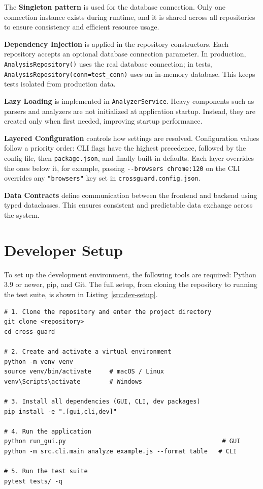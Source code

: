 The \textbf{Singleton pattern} is used for the database connection. Only one connection instance exists during runtime, and it is shared across all repositories to ensure consistency and efficient resource usage.

\textbf{Dependency Injection} is applied in the repository constructors. Each repository accepts an optional database connection parameter. In production, \texttt{AnalysisRepository()} uses the real database connection; in tests, \texttt{AnalysisRepository(conn=test\_conn)} uses an in-memory database. This keeps tests isolated from production data.

\textbf{Lazy Loading} is implemented in \texttt{AnalyzerService}. Heavy components such as parsers and analyzers are not initialized at application startup. Instead, they are created only when first needed, improving startup performance.

\textbf{Layered Configuration} controls how settings are resolved. Configuration values follow a priority order: CLI flags have the highest precedence, followed by the config file, then \texttt{package.json}, and finally built-in defaults. Each layer overrides the ones below it, for example, passing \texttt{-{}-browsers chrome:120} on the CLI overrides any \texttt{"browsers"} key set in \texttt{crossguard.config.json}.

\textbf{Data Contracts} define communication between the frontend and backend using typed dataclasses. This ensures consistent and predictable data exchange across the system.

\section{Developer Setup}
\label{sec:setup}

To set up the development environment, the following tools are required: Python 3.9 or newer, pip, and Git. The full setup, from cloning the repository to running the test suite, is shown in Listing~\ref{src:dev-setup}.

\begin{lstlisting}[caption={Complete developer setup: clone, virtual environment, install, run, and test}, label=src:dev-setup, basicstyle=\ttfamily\small, breaklines=true]
# 1. Clone the repository and enter the project directory
git clone <repository>
cd cross-guard

# 2. Create and activate a virtual environment
python -m venv venv
source venv/bin/activate     # macOS / Linux
venv\Scripts\activate        # Windows

# 3. Install all dependencies (GUI, CLI, dev packages)
pip install -e ".[gui,cli,dev]"

# 4. Run the application
python run_gui.py                                           # GUI
python -m src.cli.main analyze example.js --format table   # CLI

# 5. Run the test suite
pytest tests/ -q
\end{lstlisting}

